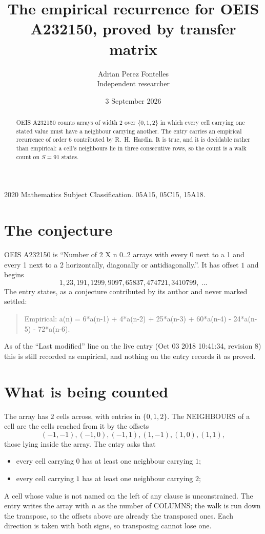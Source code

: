 \documentclass[11pt,a4paper]{article}
\title{The empirical recurrence for OEIS A232150, proved by transfer matrix}
\author{Adrian Perez Fontelles\\ \small Independent researcher}
\date{3 September 2026}
\theoremstyle{plain}
\theoremstyle{definition}
\begin{document}
\maketitle

\begin{abstract}
OEIS A232150 counts arrays of width $2$ over $\{0,1,2\}$ in which every cell carrying one stated
value must have a neighbour carrying another. The entry carries an empirical recurrence of
order $6$ contributed by R.~H.~Hardin. It is true, and it is decidable rather than
empirical: a cell's neighbours lie in three consecutive rows, so the count is a walk count on
$S=91$ states.
\end{abstract}

\noindent\small 2020 Mathematics Subject Classification. 05A15, 05C15, 15A18.\normalsize

\section{The conjecture}

OEIS A232150 is ``Number of 2 X n 0..2 arrays with every 0 next to a 1 and every 1 next to a 2 horizontally, diagonally or antidiagonally.''. It has offset $1$ and begins
\[
1, 23, 191, 1299, 9097, 65837, 474721, 3410799,\ \dots
\]
The entry states, as a conjecture contributed by its author and never marked settled:
\begin{quote}
Empirical: a(n) = 6*a(n-1) + 4*a(n-2) + 25*a(n-3) + 60*a(n-4) - 24*a(n-5) - 72*a(n-6).
\end{quote}
As of the ``Last modified'' line on the live entry (Oct 03 2018 10:41:34, revision 8) this is still
recorded as empirical, and nothing on the entry records it as proved.

\section{What is being counted}

The array has $2$ cells across, with entries in $\{0,1,2\}$. The NEIGHBOURS of a cell are the
cells reached from it by the offsets
\[
(-1,-1), (-1,0), (-1,1), (1,-1), (1,0), (1,1),
\]
those lying inside the array. The entry asks that
\begin{itemize}
\item every cell carrying $0$ has at least one neighbour carrying $1$;
\item every cell carrying $1$ has at least one neighbour carrying $2$;

\end{itemize}
A cell whose value is not named on the left of any clause is unconstrained. The entry writes the array with $n$ as the number of COLUMNS; the walk is run down the transpose, so the offsets above are already the transposed ones. Each direction is taken with both signs, so transposing cannot lose one.
\end{document}
